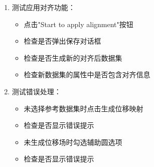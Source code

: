 \documentclass[a4paper,12pt]{report}	%
\begin{document}
\begin{enumerate}
    \item 测试应用对齐功能：
    \begin{itemize}
        \item 点击"Start to apply alignment"按钮
        \item 检查是否弹出保存对话框
        \item 检查是否生成新的对齐后数据集
        \item 检查新数据集的属性中是否包含对齐信息
    \end{itemize}

    \item 测试错误处理：
    \begin{itemize}
        \item 未选择参考数据集时点击生成位移映射
        \item 检查是否显示错误提示
        \item 未生成位移场时勾选辅助圆选项
        \item 检查是否显示错误提示
    \end{itemize}
\end{enumerate}
\end{document}
